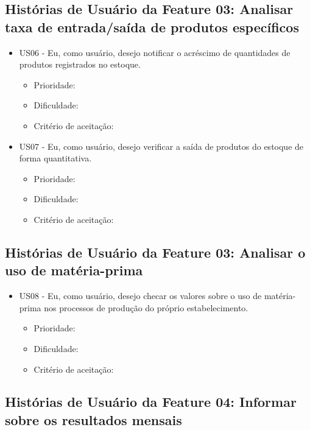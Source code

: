 \subsection{Histórias de Usuário da Feature 03: Analisar taxa de entrada/saída de produtos específicos}

\begin{itemize}

\item US06 - Eu, como usuário, desejo notificar o acréscimo de quantidades de produtos registrados no estoque.
    \begin{itemize}
    \item Prioridade:
    \item Dificuldade:
    \item Critério de aceitação:
    \end{itemize}


\item US07 - Eu, como usuário, desejo verificar a saída de produtos do estoque de forma quantitativa.
    \begin{itemize}
    \item Prioridade:
    \item Dificuldade:
    \item Critério de aceitação:
    \end{itemize}


\end{itemize}


\subsection{Histórias de Usuário da Feature 03: Analisar o uso de matéria-prima}

\begin{itemize}

\item US08 - Eu, como usuário, desejo checar os valores sobre o uso de matéria-prima nos processos de produção do próprio estabelecimento.
    \begin{itemize}
    \item Prioridade:
    \item Dificuldade:
    \item Critério de aceitação:
    \end{itemize}


\end{itemize}


\subsection{Histórias de Usuário da Feature 04: Informar sobre os resultados mensais}

